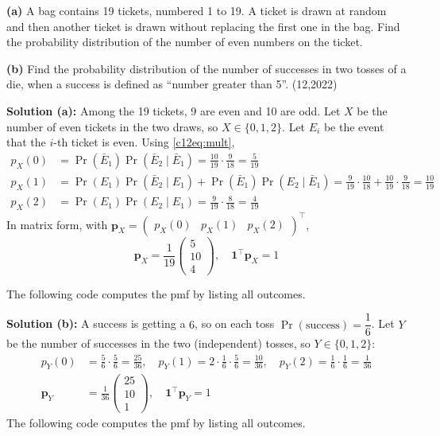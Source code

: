 \item \textbf{(a)} A bag contains 19 tickets, numbered 1 to 19. A ticket is drawn at random and then another ticket is drawn without replacing the first one in the bag. Find the probability distribution of the number of even numbers on the ticket.

\textbf{(b)} Find the probability distribution of the number of successes in two tosses of a die, when a success is defined as ``number greater than 5''. \hfill (12,2022)

\textbf{Solution (a):} Among the 19 tickets, 9 are even and 10 are odd. Let $X$ be the number of even tickets in the two draws, so $X \in \{0,1,2\}$. Let $E_i$ be the event that the $i$-th ticket is even. Using \eqref{c12eq:mult},
\begin{align}
p_X(0) &= \Pr(\bar{E}_1)\Pr(\bar{E}_2 \mid \bar{E}_1) = \frac{10}{19}\cdot\frac{9}{18} = \frac{5}{19} \\
p_X(1) &= \Pr(E_1)\Pr(\bar{E}_2 \mid E_1) + \Pr(\bar{E}_1)\Pr(E_2 \mid \bar{E}_1) = \frac{9}{19}\cdot\frac{10}{18} + \frac{10}{19}\cdot\frac{9}{18} = \frac{10}{19} \\
p_X(2) &= \Pr(E_1)\Pr(E_2 \mid E_1) = \frac{9}{19}\cdot\frac{8}{18} = \frac{4}{19}
\end{align}
In matrix form, with $\mathbf{p}_X = \begin{pmatrix} p_X(0) & p_X(1) & p_X(2) \end{pmatrix}^{\top}$,
\begin{equation}
\mathbf{p}_X = \frac{1}{19}\begin{pmatrix} 5 \\ 10 \\ 4 \end{pmatrix}, \quad \mathbf{1}^{\top}\mathbf{p}_X = 1
\end{equation}

The following code computes the pmf by listing all outcomes.

\nopagebreak[4]
\begin{center}
\end{center}

\textbf{Solution (b):} A success is getting a $6$, so on each toss $\Pr(\text{success}) = \dfrac{1}{6}$. Let $Y$ be the number of successes in the two (independent) tosses, so $Y \in \{0,1,2\}$:
\begin{align}
p_Y(0) &= \frac{5}{6}\cdot\frac{5}{6} = \frac{25}{36}, \quad
p_Y(1) = 2\cdot\frac{1}{6}\cdot\frac{5}{6} = \frac{10}{36}, \quad
p_Y(2) = \frac{1}{6}\cdot\frac{1}{6} = \frac{1}{36} \\
\mathbf{p}_Y &= \frac{1}{36}\begin{pmatrix} 25 \\ 10 \\ 1 \end{pmatrix}, \quad \mathbf{1}^{\top}\mathbf{p}_Y = 1
\end{align}
The following code computes the pmf by listing all outcomes.

